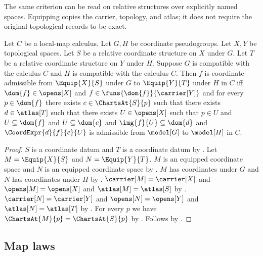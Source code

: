 The same criterion can be read on relative structures over explicitly named
spaces. Equipping copies the carrier, topology, and atlas; it does not require
the original topological records to be exact.

\begin{theorem}\label{coordinate_admissible_equip_iff}
    Let $C$ be a local-map calculus.
    Let $G,H$ be coordinate pseudogroups.
    Let $X,Y$ be topological spaces.
    Let $S$ be a relative coordinate structure on $X$ under $G$.
    Let $T$ be a relative coordinate structure on $Y$ under $H$.
    Suppose $G$ is compatible with the calculus $C$ and $H$ is compatible with the calculus $C$.
    Then $f$ is coordinate-admissible from $\Equip{X}{S}$ under $G$ to $\Equip{Y}{T}$ under $H$ in $C$ iff
        $\dom{f}\in\opens[X]$ and $f\in\funs{\dom{f}}{\carrier[Y]}$ and
        for every $p\in\dom{f}$ there exists $c\in\ChartsAt{S}{p}$ such that
            there exists $d\in\atlas[T]$ such that there exists $U\in\opens[X]$ such that
                $p\in U$ and $U\subseteq\dom{f}$ and $U\subseteq\dom{c}$ and
                $\img{f}{U}\subseteq\dom{d}$ and
                $\CoordExpr{d}{f}{c}{U}$ is admissible from $\model[G]$ to $\model[H]$ in $C$.
\end{theorem}
\begin{proof}
    $S$ is a coordinate datum and $T$ is a coordinate datum by .
    Let $M=\Equip{X}{S}$ and $N=\Equip{Y}{T}$.
    $M$ is an equipped coordinate space and $N$ is an equipped coordinate space by .
    $M$ has coordinates under $G$ and $N$ has coordinates under $H$ by
        .
    $\carrier[M]=\carrier[X]$ and $\opens[M]=\opens[X]$ and $\atlas[M]=\atlas[S]$ by
        .
    $\carrier[N]=\carrier[Y]$ and $\opens[N]=\opens[Y]$ and $\atlas[N]=\atlas[T]$ by
        .
    For every $p$ we have $\ChartsAt{M}{p}=\ChartsAt{S}{p}$ by .
    Follows by .
\end{proof}

\subsection{Map laws}


